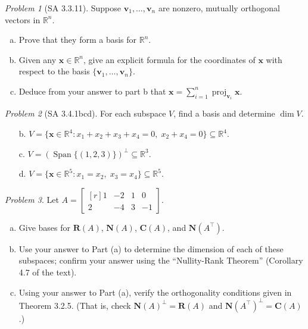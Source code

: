 \documentclass[fleqn,11pt]{paper}
\theoremstyle{remark}
\newtheorem{problem}{Problem}
\newtheorem*{solution}{{\bf Solution}}
\newcommand\R{\ensuremath{\mathbb{R}}}
\newcommand\proj{\ensuremath{\operatorname{proj}}}
\renewcommand{\dim}{\ensuremath{\operatorname{dim}}}
\newcommand\bC{\ensuremath{\mathbf C}}
\newcommand\bN{\ensuremath{\mathbf N}}
\newcommand\bR{\ensuremath{\mathbf R}}
\newcommand\Span{\ensuremath{\operatorname{Span}}}
\renewcommand{\vec}[1]{\mathbf{#1}}
\newcommand\vv{\vec{v}}
\newcommand\vx{\vec{x}}
\begin{document}
\newpage

\begin{problem}[SA 3.3.11]
Suppose $\vv_1,\dots, \vv_n$ are nonzero, mutually orthogonal vectors in $\R^n$.
\begin{enumerate}[a.]
\item 
Prove that they form a basis for $\R^n$.
\item 
Given any $\vx \in \R^n$, give an explicit formula for the coordinates of 
$\vx$ with respect to the basis $\{\vv_1,\dots, \vv_n\}$.
\item Deduce from your answer to part b that $\vx = \sum_{i=1}^n \proj_{\vv_i}\vx$.
\end{enumerate}
\end{problem}

\newpage

\begin{problem}[SA 3.4.1bcd]
For each subspace $V$, find a basis and determine $\dim V$.
\begin{enumerate}
\item[b.]
  $V = \{\vx \in \R^4 : x_1 + x_2 + x_3 + x_4 = 0, \; x_ 2 + x_4 = 0\} \subseteq  \R^4$.
\item[c.] $V = \left(\Span\{(1, 2, 3)\}\right)^\bot \subseteq \R^3$.
\item[d.] $V = \{\vx \in \R^5 : x_1 = x_2, \; x_3 = x_4 \} \subseteq \R^5$.
\end{enumerate}
\end{problem}

\newpage

\begin{problem} %
  Let
  $A = \begin{bmatrix*}[r]
      1&-2 & 1 & 0 \\
      2 & -4 & 3 & -1
      \end{bmatrix*}$.
  \begin{enumerate}[(a)]
  \item Give bases for $\bR(A)$, $\bN(A)$, $\bC(A)$, and $\bN(A^\top)$.
  \item Use your answer to Part (a) to determine the dimension
    of each of these subspaces; confirm your answer using
    the ``Nullity-Rank  Theorem'' (Corollary 4.7 of the text).
  \item Using your answer to Part (a), verify the orthogonality conditions
    given in Theorem 3.2.5. (That is, check $\bN(A)^\bot = \bR(A)$ and $\bN(A^\top)^\bot = \bC(A)$.)
  \end{enumerate}
\end{problem}
\end{document}
